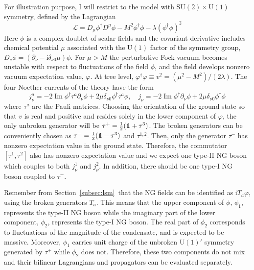 \documentclass[final,3p,times,12pt,a4paper,sort&compress]{elsarticle}
\newcommand\gr[1]{\mathrm{#1}}              %
\newcommand\Lag{\mathscr{L}}                %
\newcommand\he[1]{#1^{\dagger}}             %
\newcommand\imag{\mathrm i}                 %
\DeclareRobustCommand\openone{\leavevmode\hbox{\small1\normalsize\kern-.33em1}}
\newcommand\de{\partial}
\newcommand\vp{\varphi}
\DeclareMathOperator{\im}{Im}               %
\begin{document}
For illustration purpose, I will restrict to the model with $\gr{SU(2)\times
U(1)}$ symmetry, defined by the Lagrangian
\cite{Schafer:2001bq,Miransky:2001tw}
\begin{equation}
\Lag=D_\mu\he\phi D^\mu\phi-M^2\he\phi\phi-\lambda(\he\phi\phi)^2
\label{Lag_Miransky}
\end{equation}
Here $\phi$ is a complex doublet of scalar fields and the covariant derivative
includes chemical potential $\mu$ associated with the $\gr{U(1)}$ factor of the
symmetry group, $D_\nu\phi=(\de_\nu-\imag\delta_{\nu0}\mu)\phi$. For $\mu>M$
the perturbative Fock vacuum becomes unstable with respect to fluctuations of
the field $\phi$, and the field develops nonzero vacuum expectation value,
$\vp$. At tree level, $\he\vp\vp\equiv v^2=(\mu^2-M^2)/(2\lambda)$. The four
Noether currents of the theory have the form
\begin{equation}
j^a_\nu=-2\im\he\phi\tau^a\de_\nu\phi+2\mu\delta_{\nu0}\he\phi\tau^a\phi,\quad
j_\nu=-2\im\he\phi\de_\nu\phi+2\mu\delta_{\nu0}\he\phi\phi
\label{lsmcurrents}
\end{equation}
where $\tau^a$ are the Pauli matrices. Choosing the orientation of the ground
state so that $v$ is real and positive and resides solely in the lower
component of $\varphi$, the only unbroken generator will be
$\tau^+=\frac12(\openone+\tau^3)$. The broken generators can be conveniently
chosen as $\tau^-=\frac12(\openone-\tau^3)$ and $\tau^{1,2}$. Then, only the
generator $\tau^-$ has nonzero expectation value in the ground state.
Therefore, the commutator $[\tau^1,\tau^2]$ also has nonzero expectation value
and we expect one type-II NG boson which couples to both $j^1_\nu$ and
$j^2_\nu$. In addition, there should be one type-I NG boson coupled to
$\tau^-$.

Remember from Section~\ref{subsec:lsm}\ that the NG fields can be identified as
$\imag T_a\vp$, using the broken generators $T_a$. This means that the upper
component of $\phi$, $\phi_1$, represents the type-II NG boson while the
imaginary part of the lower component, $\phi_2$, represents the type-I NG boson.
The real part of $\phi_2$ corresponds to fluctuations of the magnitude of the
condensate, and is expected to be massive. Moreover, $\phi_1$ carries unit
charge of the unbroken $\gr{U(1)}'$ symmetry generated by $\tau^+$ while
$\phi_2$ does not. Therefore, these two components do not mix and their bilinear
Lagrangians and propagators can be evaluated separately.
\end{document}
